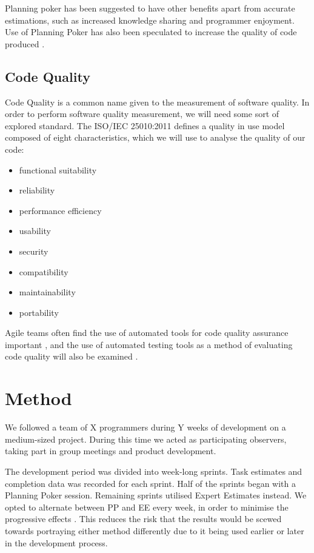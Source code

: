 \documentclass{sigchi}
\begin{document}
Planning poker has been suggested to have other benefits apart from accurate estimations, such as increased knowledge sharing and programmer enjoyment. Use of Planning Poker has also been speculated to increase the quality of code produced \cite{molokken2008using}.

\subsection{Code Quality}
Code Quality is a common name given to the measurement of software quality.
In order to perform software quality measurement, we will need some sort of explored standard.
The ISO/IEC 25010:2011 defines a quality in use model composed of eight characteristics\cite{iso250102011}, which we will use to analyse the quality of our code:
\begin{itemize}
\setlength{\itemsep}{0.25em}
\item functional suitability
\item reliability
\item performance efficiency
\item usability
\item security
\item compatibility
\item maintainability
\item portability
\end{itemize}

Agile teams often find the use of automated tools for code quality assurance important \cite{Williams:2012:ATT:2133806.2133823}, and the use of automated testing tools as a method of evaluating code quality will also be examined \cite{ala2005survey}.

\section{Method}

We followed a team of X programmers during Y weeks of development on a medium-sized project. During this time we acted as participating observers, taking part in group meetings and product development.

The development period was divided into week-long sprints. Task estimates and completion data was recorded for each sprint. Half of the sprints began with a Planning Poker session. Remaining sprints utilised Expert Estimates instead. We opted to alternate between PP and EE every week, in order to minimise the progressive effects \cite{kjellberg2011experimentell}. This reduces the risk that the results would be scewed towards portraying either method differently due to it being used earlier or later in the development process.
\end{document}
